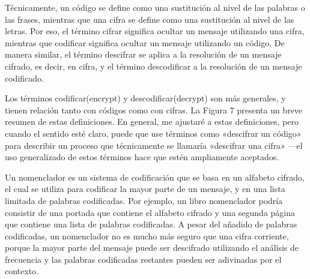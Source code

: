 	  Técnicamente, un código se define como una sustitución al nivel de las palabras o las frases, mientras que una cifra se define como una sustitución al nivel de las letras. Por eso, el término cifrar significa ocultar un mensaje utilizando una cifra, mientras que codificar significa ocultar un mensaje utilizando un código. De manera similar, el término descifrar se aplica a la resolución de un mensaje cifrado, es decir, en cifra, y el término descodificar a la resolución de un mensaje codificado.

Los términos codificar(encrypt) y descodificar(decrypt) son más generales, y tienen relación tanto con códigos como con cifras. La Figura 7 presenta un breve resumen de estas definiciones. En general, me ajustaré a estas definiciones, pero cuando el sentido esté claro, puede que use términos como «descifrar un código» para describir un proceso que técnicamente se llamaría «descifrar una cifra» —el uso generalizado de estos términos hace que estén ampliamente aceptados.

Un nomenclador es un sistema de codificación que se basa en un alfabeto cifrado, el cual se utiliza para codificar la mayor parte de un mensaje, y en una lista limitada de palabras codificadas. Por ejemplo, un libro nomenclador podría consistir de una portada que contiene el alfabeto cifrado y una segunda página que contiene una lista de palabras codificadas. A pesar del añadido de palabras codificadas, un nomenclador no es mucho más seguro que una cifra corriente, porque la mayor parte del mensaje puede ser descifrado utilizando el análisis de frecuencia y las palabras codificadas restantes pueden ser adivinadas por el contexto.
	 
	 
